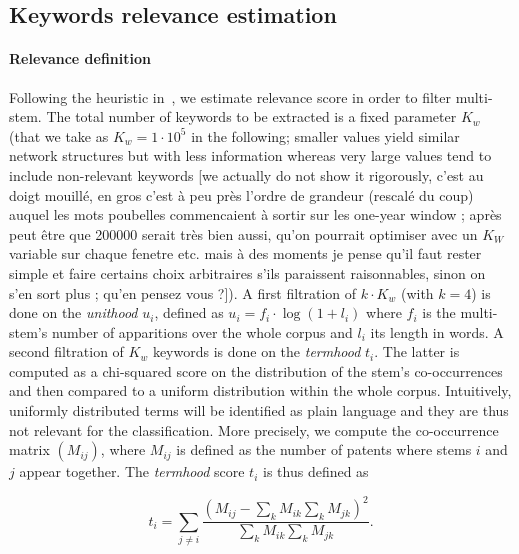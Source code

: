 \documentclass[10pt,A4]{article}
\begin{document}
\subsection{Keywords relevance estimation}
\paragraph{Relevance definition}

Following the heuristic in~\cite{chavalarias2013phylomemetic}, we estimate relevance score in order to filter multi-stem. The total number of keywords to be extracted is a fixed parameter $K_w$ (that we take as $K_w = 1\cdot 10^5$ in the following; smaller values yield similar network structures but with less information whereas very large values tend to include non-relevant keywords [we actually do not show it rigorously, c'est au doigt mouillé, en gros c'est à peu près l'ordre de grandeur (rescalé du coup) auquel les mots poubelles commencaient à sortir sur les one-year window ; après peut être que 200000 serait très bien aussi, qu'on pourrait optimiser avec un $K_W$ variable sur chaque fenetre etc. mais à des moments je pense qu'il faut rester simple et faire certains choix arbitraires s'ils paraissent raisonnables, sinon on s'en sort plus ; qu'en pensez vous ?]). A first filtration of $k\cdot K_w$ (with $k=4$) is done on the \emph{unithood} $u_i$, defined as $u_i = f_i\cdot \log{(1 + l_i)}$ where $f_i$ is the multi-stem's number of apparitions over the whole corpus and $l_i$ its length in words. A second filtration of $K_w$ keywords is done on the \emph{termhood} $t_i$. The latter is computed as a chi-squared score on the distribution of the stem's co-occurrences and then compared to a uniform distribution within the whole corpus. Intuitively, uniformly distributed terms will be identified as plain language and they are thus not relevant for the classification. More precisely, we compute the co-occurrence matrix $(M_{ij})$, where $M_{ij}$ is defined as the number of patents where stems $i$ and $j$ appear together. The \emph{termhood} score $t_i$ is thus defined as

\[
t_i = \sum_{j\neq i}\frac{\left( M_{ij} - \sum_{k}M_{ik} \sum_{k} M_{jk}\right)^2}{\sum_{k}M_{ik} \sum_{k} M_{jk}}.
\]
\end{document}
